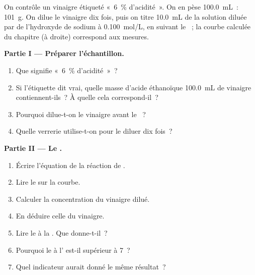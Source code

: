 \begin{problem}
\label{pb:g12:ph-conductivity-titrations:1}
On contrôle un vinaigre étiqueté «~6~\% d'acidité~». On en pèse
\qty{100.0}{mL}~: \qty{101}{g}. On dilue le vinaigre dix fois, puis on
titre \qty{10.0}{mL} de la solution diluée par de l'hydroxyde de sodium
à \qty{0.100}{mol/L}, en suivant le ~; la courbe calculée du
chapitre (à droite) correspond aux mesures.

\medskip
\noindent\textbf{Partie I --- Préparer l'échantillon.}
\begin{enumerate}
  \item Que signifie «~6~\% d'acidité~»~?
  \item Si l'étiquette dit vrai, quelle masse d'acide éthanoïque
        \qty{100.0}{mL} de vinaigre contiennent-ils~? À quelle
         cela correspond-il~?
  \item Pourquoi dilue-t-on le vinaigre avant le ~?
  \item Quelle verrerie utilise-t-on pour le diluer dix fois~?
\end{enumerate}

\medskip
\noindent\textbf{Partie II --- Le .}
\begin{enumerate}[resume]
  \item Écrire l'équation de la réaction de .
  \item Lire le  sur la courbe.
  \item Calculer la concentration du vinaigre dilué.
  \item En déduire celle du vinaigre.
  \item Lire le  à la . Que donne-t-il~?
  \item Pourquoi le  à l' est-il supérieur à 7~?
  \item Quel indicateur aurait donné le même résultat~?
\end{enumerate}


\end{problem}
